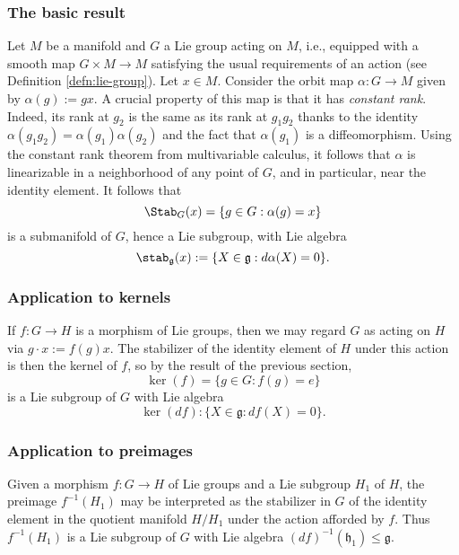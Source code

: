 \documentclass[reqno]{amsart} 
\begin{document}
\subsubsection{The basic result\label{sec:stab-basic-result}}
\label{sec:org9ced8a6}
Let $M$ be a manifold and $G$ a Lie group acting on $M$, i.e., equipped with a smooth map $G \times M \rightarrow M$ satisfying the usual requirements of an action (see Definition \ref{defn:lie-group}).  Let $x \in M$.  Consider the orbit map $\alpha : G \rightarrow M$ given by $\alpha(g) := g x$.  A crucial property of this map is that it has \emph{constant rank}.  Indeed, its rank at $g_2$ is the same as its rank at $g_1 g_2$ thanks to the identity $\alpha(g_1 g_2) = \alpha(g_1) \alpha(g_2)$ and the fact that $\alpha(g_1)$ is a diffeomorphism.  Using the constant rank theorem from multivariable calculus, it follows that $\alpha$ is linearizable in a neighborhood of any point of $G$, and in particular, near the identity element.  It follows that
\begin{equation*}
  \Stab_G(x) = \{g \in G : \alpha(g) = x\}
\end{equation*}
is a submanifold of $G$, hence a Lie subgroup, with Lie algebra
\begin{equation*}
  \stab_\mathfrak{g}(x) := \{X \in \mathfrak{g} : d \alpha(X) = 0\}.
\end{equation*}

\subsubsection{Application to kernels}
\label{sec:org93667ef}
If $f : G \rightarrow H$ is a morphism of Lie groups, then we may regard $G$ as acting on $H$ via $g \cdot x := f(g) x$.  The stabilizer of the identity element of $H$ under this action is then the kernel of $f$, so by the result of the previous section,
\begin{equation*}
  \ker(f) = \{g \in G : f(g) = e\}
\end{equation*}
is a Lie subgroup of $G$ with Lie algebra
\begin{equation*}
  \ker(d f) : \{X \in \mathfrak{g} : d f (X) = 0 \}.
\end{equation*}

\subsubsection{Application to preimages\label{sec:stab-appl-preimages}}
\label{sec:org79033ad}
Given a morphism $f : G \rightarrow H$ of Lie groups and a Lie subgroup $H_1$ of $H$, the preimage $f^{-1}(H_1)$ may be interpreted as the stabilizer in $G$ of the identity element in the quotient manifold $H/H_1$ under the action afforded by $f$.  Thus $f^{-1}(H_1)$ is a Lie subgroup of $G$ with Lie algebra $(d f)^{-1}(\mathfrak{h}_1) \leq \mathfrak{g}$.
\end{document}
